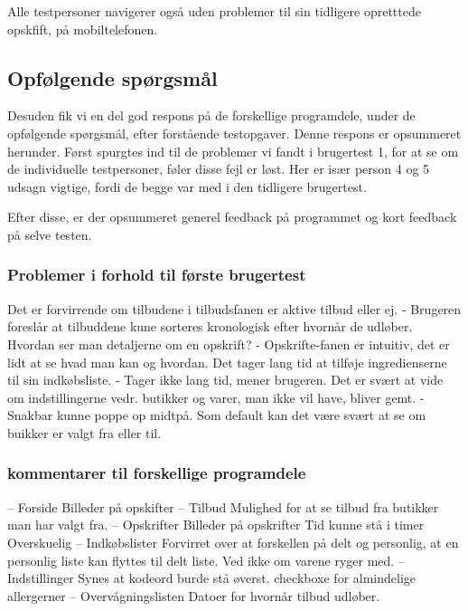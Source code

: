 Alle testpersoner navigerer også uden problemer til sin tidligere opretttede opskfift, på mobiltelefonen.

\subsection{Opfølgende spørgsmål}
Desuden fik vi en del god respons på de forskellige programdele, under de opfølgende spørgsmål, efter forstående testopgaver.
Denne respons er opsummeret herunder.
Først spurgtes ind til de problemer vi fandt i brugertest 1, for at se om de individuelle testpersoner, føler disse fejl er løst. 
Her er især person 4 og 5 udsagn vigtige, fordi de begge var med i den tidligere brugertest.

Efter disse, er der opsummeret generel feedback på programmet og kort feedback på selve testen.

\subsubsection{Problemer i forhold til første brugertest}
Det er forvirrende om tilbudene i tilbudsfanen er aktive tilbud eller ej.
 - Brugeren foreslår at tilbuddene kune sorteres kronologisk efter hvornår de udløber.
Hvordan ser man detaljerne om en opskrift?
 - Opskrifte-fanen er intuitiv, det er lidt at se hvad man kan og hvordan.
Det tager lang tid at tilføje ingredienserne til sin indkøbsliste.
 - Tager ikke lang tid, mener brugeren.
Det er svært at vide om indstillingerne vedr. butikker og varer, man ikke vil have, bliver gemt.
 - Snakbar kunne poppe op midtpå. Som default kan det være svært at se om buikker er valgt fra eller til.
\subsubsection{kommentarer til forskellige programdele}
– Forside
	Billeder på opskifter
– Tilbud
	Mulighed for at se tilbud fra butikker man har valgt fra.
– Opskrifter
	Billeder på opskrifter
	Tid kunne stå i timer
	Overskuelig
– Indkøbslister
	Forvirret over at forskellen på delt og personlig, at en personlig liste kan flyttes til delt liste. Ved ikke om varene ryger med.
– Indstillinger
Synes at kodeord burde stå øverst.
checkboxe for almindelige allergerner
– Overvågningslisten
	Datoer for hvornår tilbud udløber.

